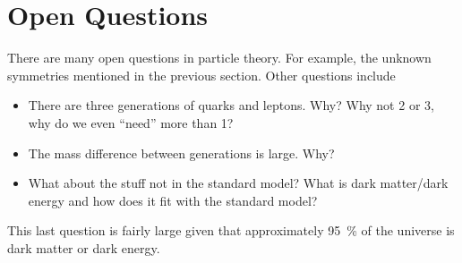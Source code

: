 \documentclass[fleqn]{NotesClass}
\begin{document}
    \section{Open Questions}
    There are many open questions in particle theory.
    For example, the unknown symmetries mentioned in the previous section.
    Other questions include
    \begin{itemize}
        \item There are three generations of quarks and leptons.
        Why?
        Why not 2 or 3, why do we even \enquote{need} more than 1?
        \item The mass difference between generations is large.
        Why?
        \item What about the stuff not in the standard model?
        What is dark matter/dark energy and how does it fit with the standard model?
    \end{itemize}
    This last question is fairly large given that approximately \qty{95}{\percent} of the universe is dark matter or dark energy.
    
\end{document}
